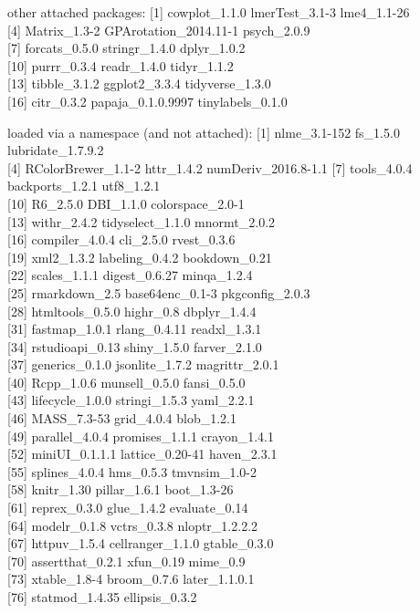 \begin{appendix}
other attached packages: {[}1{]} cowplot\_1.1.0 lmerTest\_3.1-3
lme4\_1.1-26\\
{[}4{]} Matrix\_1.3-2 GPArotation\_2014.11-1 psych\_2.0.9\\
{[}7{]} forcats\_0.5.0 stringr\_1.4.0 dplyr\_1.0.2\\
{[}10{]} purrr\_0.3.4 readr\_1.4.0 tidyr\_1.1.2\\
{[}13{]} tibble\_3.1.2 ggplot2\_3.3.4 tidyverse\_1.3.0\\
{[}16{]} citr\_0.3.2 papaja\_0.1.0.9997 tinylabels\_0.1.0

loaded via a namespace (and not attached): {[}1{]} nlme\_3.1-152
fs\_1.5.0 lubridate\_1.7.9.2\\
{[}4{]} RColorBrewer\_1.1-2 httr\_1.4.2 numDeriv\_2016.8-1.1 {[}7{]}
tools\_4.0.4 backports\_1.2.1 utf8\_1.2.1\\
{[}10{]} R6\_2.5.0 DBI\_1.1.0 colorspace\_2.0-1\\
{[}13{]} withr\_2.4.2 tidyselect\_1.1.0 mnormt\_2.0.2\\
{[}16{]} compiler\_4.0.4 cli\_2.5.0 rvest\_0.3.6\\
{[}19{]} xml2\_1.3.2 labeling\_0.4.2 bookdown\_0.21\\
{[}22{]} scales\_1.1.1 digest\_0.6.27 minqa\_1.2.4\\
{[}25{]} rmarkdown\_2.5 base64enc\_0.1-3 pkgconfig\_2.0.3\\
{[}28{]} htmltools\_0.5.0 highr\_0.8 dbplyr\_1.4.4\\
{[}31{]} fastmap\_1.0.1 rlang\_0.4.11 readxl\_1.3.1\\
{[}34{]} rstudioapi\_0.13 shiny\_1.5.0 farver\_2.1.0\\
{[}37{]} generics\_0.1.0 jsonlite\_1.7.2 magrittr\_2.0.1\\
{[}40{]} Rcpp\_1.0.6 munsell\_0.5.0 fansi\_0.5.0\\
{[}43{]} lifecycle\_1.0.0 stringi\_1.5.3 yaml\_2.2.1\\
{[}46{]} MASS\_7.3-53 grid\_4.0.4 blob\_1.2.1\\
{[}49{]} parallel\_4.0.4 promises\_1.1.1 crayon\_1.4.1\\
{[}52{]} miniUI\_0.1.1.1 lattice\_0.20-41 haven\_2.3.1\\
{[}55{]} splines\_4.0.4 hms\_0.5.3 tmvnsim\_1.0-2\\
{[}58{]} knitr\_1.30 pillar\_1.6.1 boot\_1.3-26\\
{[}61{]} reprex\_0.3.0 glue\_1.4.2 evaluate\_0.14\\
{[}64{]} modelr\_0.1.8 vctrs\_0.3.8 nloptr\_1.2.2.2\\
{[}67{]} httpuv\_1.5.4 cellranger\_1.1.0 gtable\_0.3.0\\
{[}70{]} assertthat\_0.2.1 xfun\_0.19 mime\_0.9\\
{[}73{]} xtable\_1.8-4 broom\_0.7.6 later\_1.1.0.1\\
{[}76{]} statmod\_1.4.35 ellipsis\_0.3.2


\end{appendix}
